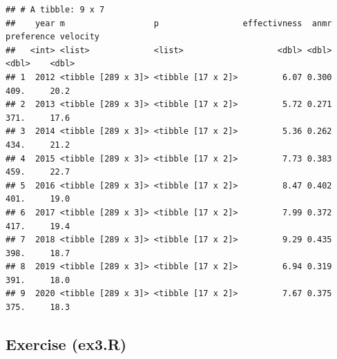 \documentclass[
]{book}
\begin{document}
\begin{verbatim}
## # A tibble: 9 x 7
##    year m                  p                 effectivness  anmr preference velocity
##   <int> <list>             <list>                   <dbl> <dbl>      <dbl>    <dbl>
## 1  2012 <tibble [289 x 3]> <tibble [17 x 2]>         6.07 0.300       409.     20.2
## 2  2013 <tibble [289 x 3]> <tibble [17 x 2]>         5.72 0.271       371.     17.6
## 3  2014 <tibble [289 x 3]> <tibble [17 x 2]>         5.36 0.262       434.     21.2
## 4  2015 <tibble [289 x 3]> <tibble [17 x 2]>         7.73 0.383       459.     22.7
## 5  2016 <tibble [289 x 3]> <tibble [17 x 2]>         8.47 0.402       401.     19.0
## 6  2017 <tibble [289 x 3]> <tibble [17 x 2]>         7.99 0.372       417.     19.4
## 7  2018 <tibble [289 x 3]> <tibble [17 x 2]>         9.29 0.435       398.     18.7
## 8  2019 <tibble [289 x 3]> <tibble [17 x 2]>         6.94 0.319       391.     18.0
## 9  2020 <tibble [289 x 3]> <tibble [17 x 2]>         7.67 0.375       375.     18.3
\end{verbatim}

\hypertarget{exercise-ex3.r}{%
\subsection{Exercise (ex3.R)}\label{exercise-ex3.r}}
\end{document}
